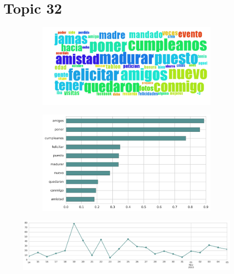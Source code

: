 \clearpage

\section{Topic 32}

\begin{figure}[htbp!]
    \centering
    \begin{subfigure}[b]{0.49\textwidth}
        \includegraphics[width=\textwidth]{twitter_all/report_images/topic-32-wordcloud.jpg}
    \end{subfigure}
    \begin{subfigure}[b]{0.49\textwidth}
        \includegraphics[width=\textwidth]{twitter_all/report_images/topic-32-terms.jpg}
    \end{subfigure}
\end{figure}

\begin{figure}[htbp!]
    \centering
    \includegraphics[width=\textwidth]{twitter_all/report_images/topic-32-timeseries.jpg}
\end{figure}

